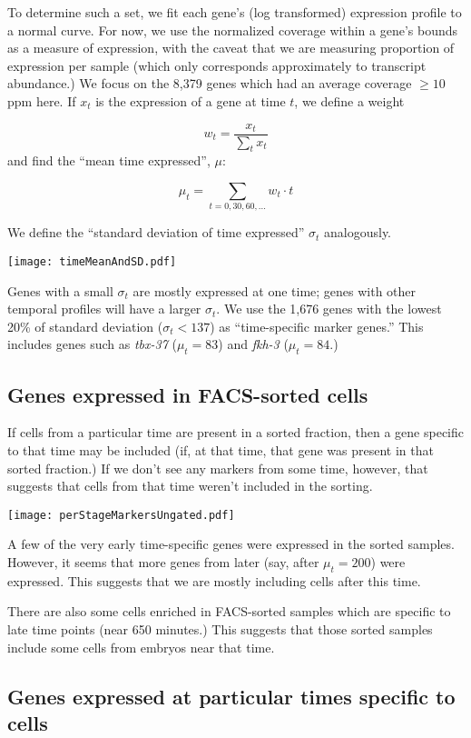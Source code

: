 \documentclass{article}
\begin{document}
To determine such a set, we fit each gene's (log transformed) expression
profile to a normal curve.
For now, we use the normalized coverage within a gene's bounds as a measure
of expression, with the caveat that we are measuring proportion of expression per
sample (which only corresponds approximately to transcript abundance.)
We focus on the 8,379 genes which had an average coverage $\ge 10$ ppm here.
If $x_t$ is the expression of a gene at time $t$,
we define a weight

\[
w_t = \frac{x_t}{\sum_t x_t}
\]
and find the ``mean time expressed'', $\mu$:

\[
\mu_t = \sum_{t = 0,30,60,...} w_t \cdot t
\]

We define the ``standard deviation of time expressed'' $\sigma_t$ analogously.

\begin{center}
\texttt{[image: timeMeanAndSD.pdf]}
\end{center}

Genes with a small $\sigma_t$ are mostly expressed at one time; genes with
other temporal profiles will have a larger $\sigma_t$. We use the 1,676
genes with the lowest 20\% of standard deviation ($\sigma_t < 137$)
as ``time-specific marker genes.''
This includes genes such as {\em tbx-37} ($\mu_t = 83$) and {\em fkh-3}
($\mu_t = 84$.)

\subsection*{Genes expressed in FACS-sorted cells}

If cells from a particular time are present in a sorted fraction, then a
gene specific to that time may be included (if, at that time, that gene was present in
that sorted fraction.)
If we don't see any markers from some time, however,
that suggests that cells from that time weren't included in the sorting.

\texttt{[image: perStageMarkersUngated.pdf]}

A few of the very early time-specific genes were expressed in the sorted samples.
However, it seems that more genes from later (say, after $\mu_t = 200$)
were expressed. This suggests that we are mostly including cells after this time.

There are also some cells enriched in FACS-sorted samples which are
specific to late time points (near 650 minutes.) This suggests that those
sorted samples include some cells from embryos near that time.

\subsection*{Genes expressed at particular times specific to cells}
\end{document}
